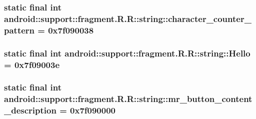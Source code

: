 \hypertarget{classandroid_1_1support_1_1fragment_1_1_r_1_1string_3be76a004dae4e9af348e16c744d728a}{
\subsubsection[{character\_\-counter\_\-pattern}]{\setlength{\rightskip}{0pt plus 5cm}static final int android::support::fragment.R.R::string::character\_\-counter\_\-pattern = 0x7f090038}}
\label{classandroid_1_1support_1_1fragment_1_1_r_1_1string_3be76a004dae4e9af348e16c744d728a}


\hypertarget{classandroid_1_1support_1_1fragment_1_1_r_1_1string_0b9fc8aca199d44f7517337f141036ba}{
\subsubsection[{Hello}]{\setlength{\rightskip}{0pt plus 5cm}static final int android::support::fragment.R.R::string::Hello = 0x7f09003e}}
\label{classandroid_1_1support_1_1fragment_1_1_r_1_1string_0b9fc8aca199d44f7517337f141036ba}


\hypertarget{classandroid_1_1support_1_1fragment_1_1_r_1_1string_d59825e471c44eee8efce32f7774f0c2}{
\subsubsection[{mr\_\-button\_\-content\_\-description}]{\setlength{\rightskip}{0pt plus 5cm}static final int android::support::fragment.R.R::string::mr\_\-button\_\-content\_\-description = 0x7f090000}}
\label{classandroid_1_1support_1_1fragment_1_1_r_1_1string_d59825e471c44eee8efce32f7774f0c2}


